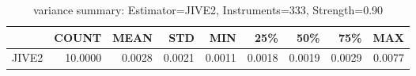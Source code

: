 \begin{table}[ht]
\centering
\caption{variance summary: Estimator=JIVE2, Instruments=333, Strength=0.90}
\begin{tabular}{lrrrrrrrr}
\toprule
 & COUNT & MEAN & STD & MIN & 25\% & 50\% & 75\% & MAX \\
\midrule
JIVE2 & 10.0000 & 0.0028 & 0.0021 & 0.0011 & 0.0018 & 0.0019 & 0.0029 & 0.0077 \\
\bottomrule
\end{tabular}
\end{table}
